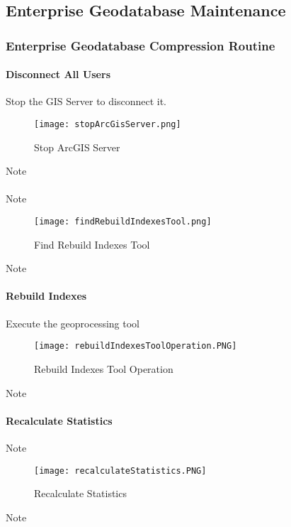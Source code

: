 \documentclass[class=article , crop=false, titlepage, twoside, multi={itemize, figure, verbatim}, float=false]{standalone}
\title{}  %
\begin{document}


\ifstandalone
\maketitle %
\tableofcontents %
\clearpage
\fi

\subsection{Enterprise Geodatabase Maintenance}

\subsubsection{Enterprise Geodatabase Compression Routine}

\paragraph{Disconnect All Users}
Stop the GIS Server to disconnect it.
\begin{figure}[h!]
\centering
    \texttt{[image: stopArcGisServer.png]}
\caption{Stop ArcGIS Server}
\end{figure}
Note 
\clearpage

\paragraph*{}Note
\begin{figure}[h!]
\centering
    \texttt{[image: findRebuildIndexesTool.png]}
\caption{Find Rebuild Indexes Tool}
\end{figure}
Note 
\clearpage

\paragraph{Rebuild Indexes}
Execute the geoprocessing tool
\begin{figure}[h!]
\centering
	\texttt{[image: rebuildIndexesToolOperation.PNG]}
\caption{Rebuild Indexes Tool Operation}
\end{figure}
Note
\clearpage

\paragraph{Recalculate Statistics}
Note
\begin{figure}[h!]
\centering
	\texttt{[image: recalculateStatistics.PNG]}
\caption{Recalculate Statistics}
\end{figure}
Note
\clearpage
\end{document}
